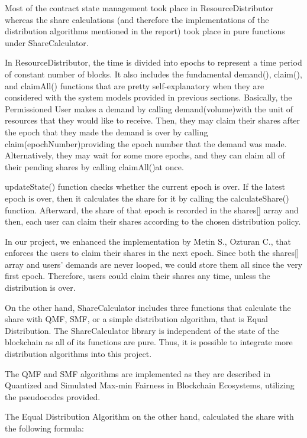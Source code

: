 \documentclass[a4paper,12pt]{report}
\begin{document}
Most of the contract state management took place in ResourceDistributor whereas the share calculations (and therefore the implementations of the distribution algorithms mentioned in the report) took place in pure functions under ShareCalculator. 

In ResourceDistributor, the time is divided into epochs to represent a time period of constant number of blocks. It also includes the fundamental demand(), claim(), and claimAll() functions that are pretty self-explanatory when they are considered with the system models provided in previous sections. Basically, the Permissioned User makes a demand by calling demand(volume)with the unit of resources that they would like to receive. Then, they may claim their shares after the epoch that they made the demand is over by calling claim(epochNumber)providing the epoch number that the demand was made. Alternatively, they may wait for some more epochs, and they can claim all of their pending shares by calling claimAll()at once.

updateState() function checks whether the current epoch is over. If the latest epoch is over, then it calculates the share for it by calling the calculateShare() function. Afterward, the share of that epoch is recorded in the shares[] array and then, each user can claim their shares according to the chosen distribution policy.

In our project, we enhanced the implementation by Metin S., Ozturan C., that enforces the users to claim their shares in the next epoch. Since both the shares[] array and users’ demands are never looped, we could store them all since the very first epoch. Therefore, users could claim their shares any time, unless the distribution is over.

\newpage 

On the other hand, ShareCalculator includes three functions that calculate the share with QMF, SMF, or a simple distribution algorithm, that is Equal Distribution. The ShareCalculator library is independent of the state of the blockchain as all of its functions are pure. Thus, it is possible to integrate more distribution algorithms into this project.

The QMF and SMF algorithms are implemented as they are described in Quantized and Simulated Max-min Fairness in Blockchain Ecosystems, utilizing the pseudocodes provided.


The Equal Distribution Algorithm on the other hand, calculated the share with the following formula:
\end{document}
